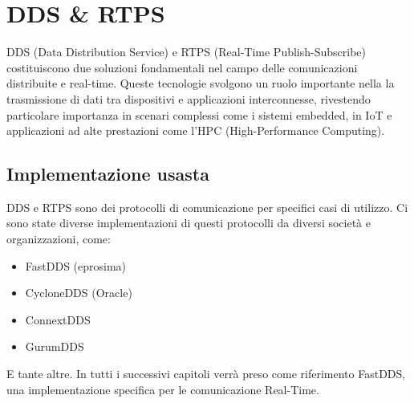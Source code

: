 \chapter{DDS \& RTPS}\label{SEC:dds}
DDS (Data Distribution Service)\cite{DDS} e RTPS (Real-Time Publish-Subscribe)\cite{RTPS} costituiscono due soluzioni fondamentali nel campo delle comunicazioni distribuite e real-time. Queste tecnologie svolgono un ruolo importante nella la trasmissione di dati tra dispositivi e applicazioni interconnesse, rivestendo particolare importanza in scenari complessi come i sistemi embedded, in IoT e applicazioni ad alte prestazioni come l'HPC (High-Performance Computing). 


\section{Implementazione usasta}
DDS e RTPS sono dei protocolli di comunicazione per specifici casi di utilizzo. Ci sono state diverse implementazioni di questi protocolli da diversi società e organizzazioni, come:
\begin{itemize}
  \item FastDDS (eprosima)
  \item CycloneDDS (Oracle)
  \item ConnextDDS
  \item GurumDDS
\end{itemize}

E tante altre. In tutti i successivi capitoli verrà preso come riferimento FastDDS, una implementazione specifica per le comunicazione Real-Time. %

